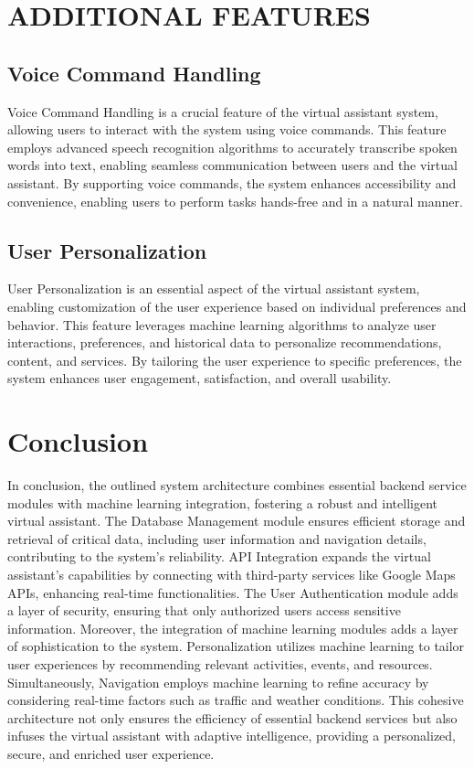\documentclass[12pt,a4paper]{report}
\begin{document}
\section{ADDITIONAL FEATURES}

\subsection{Voice Command Handling}

Voice Command Handling is a crucial feature of the virtual assistant system, allowing users to interact with the system using voice commands. This feature employs advanced speech recognition algorithms to accurately transcribe spoken words into text, enabling seamless communication between users and the virtual assistant. By supporting voice commands, the system enhances accessibility and convenience, enabling users to perform tasks hands-free and in a natural manner.

\subsection{User Personalization}

User Personalization is an essential aspect of the virtual assistant system, enabling customization of the user experience based on individual preferences and behavior. This feature leverages machine learning algorithms to analyze user interactions, preferences, and historical data to personalize recommendations, content, and services. By tailoring the user experience to specific preferences, the system enhances user engagement, satisfaction, and overall usability.


\section{Conclusion}
In conclusion, the outlined system architecture combines essential backend service modules with machine learning integration, fostering a robust and intelligent virtual assistant. The Database Management module ensures efficient storage and retrieval of critical data, including user information and navigation details, contributing to the system's reliability. API Integration expands the virtual assistant's capabilities by connecting with third-party services like Google Maps APIs, enhancing real-time functionalities. The User Authentication module adds a layer of security, ensuring that only authorized users access sensitive information. Moreover, the integration of machine learning modules adds a layer of sophistication to the system. Personalization utilizes machine learning to tailor user experiences by recommending relevant activities, events, and resources. Simultaneously, Navigation employs machine learning to refine accuracy by considering real-time factors such as traffic and weather conditions. This cohesive architecture not only ensures the efficiency of essential backend services but also infuses the virtual assistant with adaptive intelligence, providing a personalized, secure, and enriched user experience.
\end{document}
